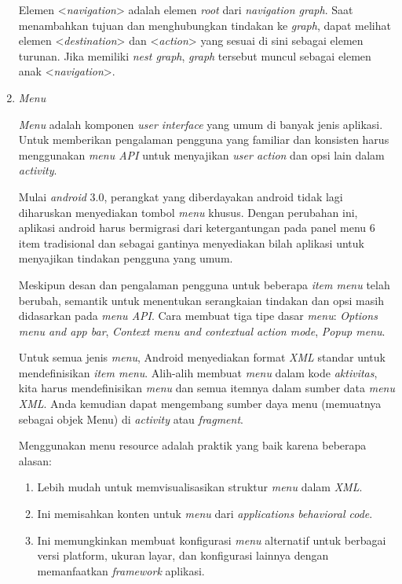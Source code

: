 \begin{enumerate}
Elemen <\textit{navigation}> adalah elemen \textit{root} dari \textit{navigation graph}. Saat menambahkan tujuan dan menghubungkan tindakan ke \textit{graph}, dapat melihat elemen <\textit{destination}> dan <\textit{action}> yang sesuai di sini sebagai elemen turunan. Jika memiliki \textit{nest graph}, \textit{graph} tersebut muncul sebagai elemen anak <\textit{navigation}>.

\item \emph{Menu}

\textit{Menu} adalah komponen \textit{user interface} yang umum di banyak jenis aplikasi. Untuk memberikan pengalaman pengguna yang familiar dan konsisten harus menggunakan \textit{menu API} untuk menyajikan \textit{user action} dan opsi lain dalam \textit{activity}.

Mulai \textit{android} 3.0, perangkat yang diberdayakan android tidak lagi diharuskan menyediakan tombol \textit{menu} khusus. Dengan perubahan ini, aplikasi android harus bermigrasi dari ketergantungan pada panel menu 6 item tradisional dan sebagai gantinya menyediakan bilah aplikasi untuk menyajikan tindakan pengguna yang umum.

Meskipun desan dan pengalaman pengguna untuk beberapa \textit{item menu} telah berubah, semantik untuk menentukan serangkaian tindakan dan opsi masih didasarkan pada \textit{menu API}. Cara membuat tiga tipe dasar \textit{menu}: \textit{Options menu and app bar}, \textit{Context menu and contextual action mode}, \textit{Popup menu}.

Untuk semua jenis \textit{menu}, Android menyediakan format \textit{XML} standar untuk mendefinisikan \textit{item menu}. Alih-alih membuat \textit{menu} dalam kode \textit{aktivitas}, kita harus mendefinisikan \textit{menu} dan semua itemnya dalam sumber data \textit{menu XML}. Anda kemudian dapat mengembang sumber daya menu (memuatnya sebagai objek Menu) di \textit{activity} atau \textit{fragment}.

Menggunakan menu resource adalah praktik yang baik karena beberapa alasan:
	\begin{enumerate}
	\item Lebih mudah untuk memvisualisasikan struktur \textit{menu} dalam \textit{XML}.
	\item Ini memisahkan konten untuk \textit{menu} dari \textit{applications behavioral code}.
	\item Ini memungkinkan membuat konfigurasi \textit{menu} alternatif untuk berbagai versi platform, ukuran layar, dan konfigurasi lainnya dengan memanfaatkan \textit{framework} aplikasi.
	\end{enumerate}


\end{enumerate}
